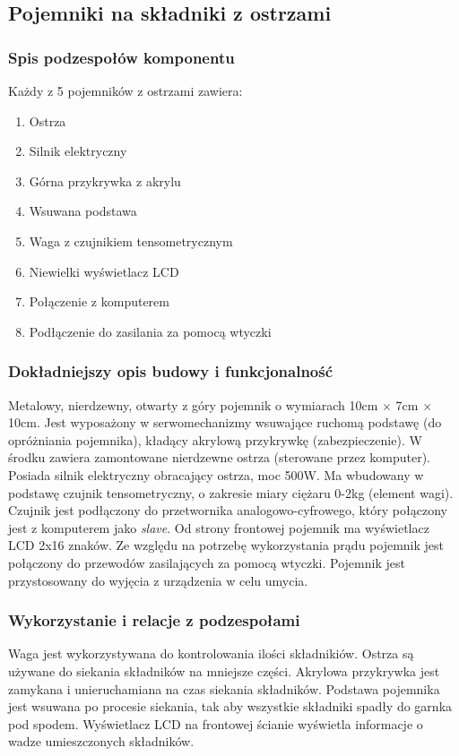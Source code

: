 \documentclass[12pt,a4paper,notitlepage]{article}
\begin{document}
\subsection{Pojemniki na składniki z ostrzami}
\subsubsection{Spis podzespołów komponentu}
Każdy z 5 pojemników z ostrzami zawiera:
\begin{enumerate}
  \item Ostrza
  \item Silnik elektryczny
  \item Górna przykrywka z akrylu
  \item Wsuwana podstawa
  \item Waga z czujnikiem tensometrycznym
  \item Niewielki wyświetlacz LCD
  \item Połączenie z komputerem
  \item Podłączenie do zasilania za pomocą wtyczki
\end{enumerate}

\subsubsection{Dokładniejszy opis budowy i funkcjonalność}
Metalowy, nierdzewny, otwarty z góry pojemnik o wymiarach 10cm $\times$ 7cm $\times$ 10cm. Jest wyposażony w serwomechanizmy wsuwające ruchomą podstawę (do opróżniania pojemnika), kładący akrylową przykrywkę (zabezpieczenie). W środku zawiera zamontowane nierdzewne ostrza (sterowane przez komputer). Posiada silnik elektryczny obracający ostrza, moc 500W. Ma wbudowany w podstawę czujnik tensometryczny, o zakresie miary ciężaru 0-2kg (element wagi). Czujnik jest podłączony do przetwornika analogowo-cyfrowego, który połączony jest z komputerem jako \emph{slave}. Od strony frontowej pojemnik ma wyświetlacz LCD 2x16 znaków. Ze względu na potrzebę wykorzystania prądu pojemnik jest połączony do przewodów zasilających za pomocą wtyczki. Pojemnik jest przystosowany do wyjęcia z urządzenia w celu umycia.
 
\subsubsection{Wykorzystanie i relacje z podzespołami}
Waga jest wykorzystywana do kontrolowania ilości składnikiów. Ostrza są używane do siekania składników na mniejsze części. Akrylowa przykrywka jest zamykana i unieruchamiana na czas siekania składników. Podstawa pojemnika jest wsuwana po procesie siekania, tak aby wszystkie składniki spadły do garnka pod spodem. Wyświetlacz LCD na frontowej ścianie wyświetla informacje o wadze umieszczonych składników.
\end{document}
